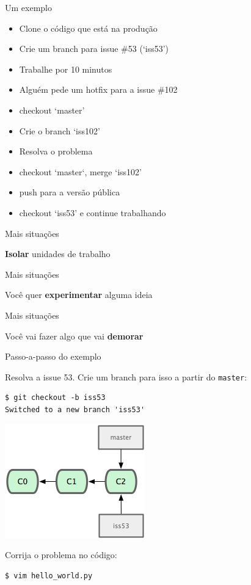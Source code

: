 \documentclass[portuguese,brazil]{beamer}
\newcommand\singlephrase[1]{
  \begin{center}
    \huge #1
  \end{center}
}
\begin{document}
\begin{frame}{Um exemplo}
\begin{itemize}
  \item Clone o código que está na produção
  \item Crie um branch para issue \#53 (`iss53')
  \item Trabalhe por 10 minutos
  \item Alguém pede um hotfix para a issue \#102
  \item checkout `master'
  \item Crie o branch `iss102'
  \item Resolva o problema
  \item checkout `master`, merge `iss102'
  \item push para a versão pública
  \item checkout `iss53' e continue trabalhando
\end{itemize}
\end{frame}

\begin{frame}{Mais situações}
  \singlephrase{\textbf{Isolar} unidades de trabalho}
\end{frame}

\begin{frame}{Mais situações}
  \singlephrase{Você quer \textbf{experimentar} alguma ideia}
\end{frame}

\begin{frame}{Mais situações}
  \singlephrase{Você vai fazer algo que vai \textbf{demorar}}
\end{frame}

\begin{frame}[fragile]{Passo-a-passo do exemplo}
\begin{center}
Resolva a issue 53. Crie um branch para isso a partir do
\texttt{master}:
\end{center}
\pause
\begin{verbatim}
$ git checkout -b iss53
Switched to a new branch 'iss53'
\end{verbatim}
\pause
\begin{center}
  \includegraphics{images/branchiss53.png}
\end{center}
\pause
\begin{center}
Corrija o problema no código:
\end{center}
\begin{verbatim}
$ vim hello_world.py
\end{verbatim}
\end{frame}
\end{document}
